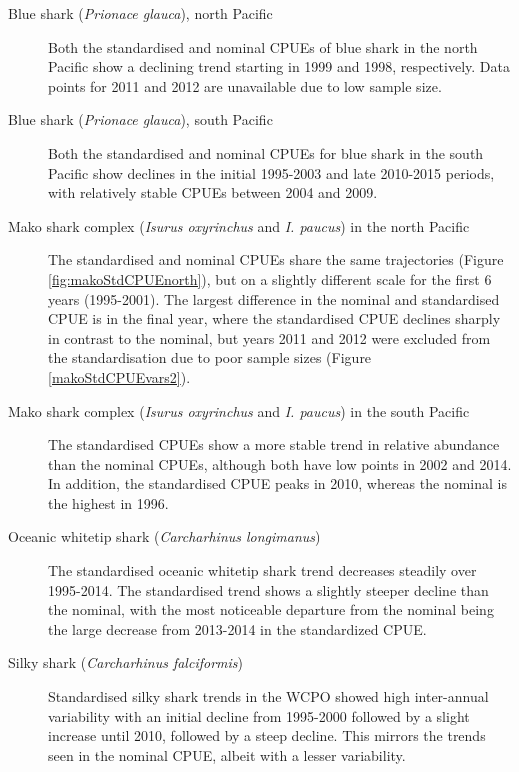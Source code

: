 \begin{description}
\item[Blue shark (\emph{Prionace glauca}), north Pacific] Both the standardised and nominal CPUEs of blue shark in the north Pacific show a declining trend starting in 1999 and 1998, respectively. Data points for 2011 and 2012 are unavailable due to low sample size.  
 
 \item[Blue shark (\emph{Prionace glauca}), south Pacific]  Both the standardised and nominal CPUEs for blue shark in the south Pacific show declines in the initial 1995-2003 and late 2010-2015 periods, with relatively stable CPUEs between 2004  and 2009.  
 
 \item[Mako shark complex (\emph{Isurus oxyrinchus} and \emph{I. paucus}) in the north Pacific] The standardised and nominal CPUEs share the same trajectories (Figure \ref{fig:makoStdCPUEnorth}), but on a slightly different scale for the first 6 years (1995-2001).  The largest difference in the nominal and standardised CPUE is in the final year, where the standardised CPUE declines sharply in contrast to the nominal, but years 2011 and 2012 were excluded from the standardisation due to poor sample sizes (Figure \ref{makoStdCPUEvars2}).
 
\item[Mako shark complex (\emph{Isurus oxyrinchus} and \emph{I. paucus}) in the south Pacific] The standardised CPUEs show a more stable trend in relative abundance than the nominal CPUEs, although both have low points in 2002 and 2014. In addition, the standardised CPUE peaks in 2010, whereas the nominal is the highest in 1996.
 
\item[Oceanic whitetip shark (\emph{Carcharhinus longimanus})] The standardised oceanic whitetip shark trend decreases steadily over 1995-2014.  The standardised trend shows a slightly steeper decline than the nominal, with the most noticeable departure from the nominal being the large decrease from 2013-2014 in the standardized CPUE.%
 
 \item[Silky shark (\emph{Carcharhinus falciformis})] Standardised silky shark trends in the WCPO showed high inter-annual variability with an initial decline from 1995-2000 followed by a slight increase until 2010, followed by a steep decline. This mirrors the trends seen in the nominal CPUE, albeit with a lesser variability.
 

\end{description}
